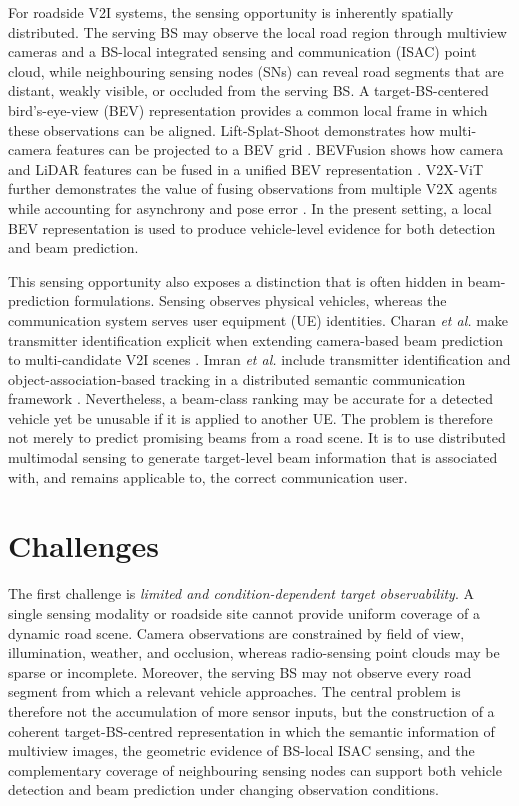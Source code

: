 For roadside V2I systems, the sensing opportunity is inherently spatially
distributed.  The serving BS may observe the local road region through multiview
cameras and a BS-local integrated sensing and communication (ISAC) point cloud,
while neighbouring sensing nodes (SNs)
can reveal road segments that are distant, weakly visible, or occluded from the
serving BS.  A target-BS-centered bird's-eye-view (BEV) representation provides
a common local frame in which these observations can be aligned.
Lift-Splat-Shoot demonstrates how multi-camera features can be projected to a
BEV grid \cite{philion2020liftsplatshootencoding}.  BEVFusion shows how camera
and LiDAR features can be fused in a unified BEV representation
\cite{liu2024bevfusionmultitaskmultisensorfusion}.  V2X-ViT further demonstrates
the value of fusing observations from multiple V2X agents while accounting for
asynchrony and pose error \cite{xu2022v2xvitvehicletoeverythingcooperativeperception}.
In the present setting, a local BEV representation is used to produce
vehicle-level evidence for both detection and beam prediction.

This sensing opportunity also exposes a distinction that is often hidden in
beam-prediction formulations.  Sensing observes physical vehicles, whereas the
communication system serves user equipment (UE) identities.  Charan \emph{et al.}
make transmitter identification explicit when extending camera-based beam
prediction to multi-candidate V2I scenes
\cite{charan2023camerabasedmmwavebeam}.  Imran \emph{et al.} include transmitter
identification and object-association-based tracking in a distributed semantic
communication framework \cite{imran2024environmentsemanticcommunicationenabling}.
Nevertheless, a beam-class ranking may be accurate for a detected vehicle yet
be unusable if it is applied to another UE.  The problem is therefore not merely
to predict promising beams from a road scene.  It is to use distributed
multimodal sensing to generate target-level beam information that is associated
with, and remains applicable to, the correct communication user.

\section{Challenges}
\label{sec:introduction-challenges}

The first challenge is \emph{limited and condition-dependent target
observability}.  A single sensing modality or roadside site cannot provide
uniform coverage of a dynamic road scene.  Camera observations are constrained
by field of view, illumination, weather, and occlusion, whereas radio-sensing
point clouds may be sparse or incomplete.  Moreover, the serving BS may not
observe every road segment from which a relevant vehicle approaches.  The
central problem is therefore not the accumulation of more sensor inputs, but
the construction of a coherent target-BS-centred representation in which the
semantic information of multiview images, the geometric evidence of BS-local
ISAC sensing, and the complementary coverage of neighbouring sensing nodes can
support both vehicle detection and beam prediction under changing observation
conditions.

